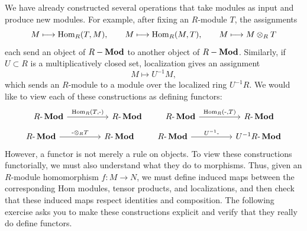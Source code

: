 \documentclass[Notebook.tex]{subfiles}
\begin{document}
We have already constructed several operations that take modules as input and produce new modules. For example, after fixing an $R$-module $T$, the assignments
\[
M \longmapsto \operatorname{Hom}_R(T,M),
\qquad
M \longmapsto \operatorname{Hom}_R(M,T),
\qquad
M \longmapsto M\otimes_R T
\]
each send an object of $R-\operatorname{\textbf{Mod}}$ to another object of $R-\operatorname{\textbf{Mod}}$. Similarly, if $U\subset R$ is a multiplicatively closed set, localization gives an assignment
\[
M \longmapsto U^{-1}M,
\]
which sends an $R$-module to a module over the localized ring $U^{-1}R$. We would like to view each of these constructions as defining functors:
\[
\begin{tikzcd}[row sep=.3em, column sep=5em]
{R\text{-}\Mod} \arrow[r, "{\Hom_R(T,\text{-})}"] & {R\text{-}\Mod}
\end{tikzcd}
\qquad
\begin{tikzcd}[row sep=.3em, column sep=5em]
{R\text{-}\Mod} \arrow[r, "{\Hom_R(\text{-},T)}"] & {R\text{-}\Mod}
\end{tikzcd}
\]
\[
\begin{tikzcd}[row sep=.3em, column sep=5em]
{R\text{-}\Mod} \arrow[r, "{\text{-}\otimes_{R}T}"] & {R\text{-}\Mod}
\end{tikzcd}
\qquad
\begin{tikzcd}[row sep=.3em, column sep=5em]
{R\text{-}\Mod} \arrow[r, "{U^{-1}\text{-}}"] & {U^{-1}R\text{-}\Mod}
\end{tikzcd}
\]
However, a functor is not merely a rule on objects. To view these constructions functorially, we must also understand what they do to morphisms. Thus, given an $R$-module homomorphism $f:M\to N$, we must define induced maps between the corresponding Hom modules, tensor products, and localizations, and then check that these induced maps respect identities and composition. The following exercise asks you to make these constructions explicit and verify that they really do define functors.

\hrulefill

\newpage 
\end{document}

